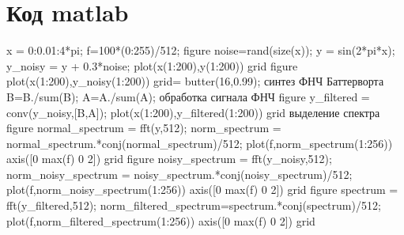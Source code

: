 \documentclass[10pt,a4paper]{report}
\begin{document}
\section{Код matlab}
x = 0:0.01:4*pi;\newline
f=100*(0:255)/512;\newline
figure\newline
noise=rand(size(x));\newline
y = sin(2*pi*x);\newline
y_noisy = y + 0.3*noise;\newline
plot(x(1:200),y(1:200))\newline
grid\newline
figure\newline
plot(x(1:200),y_noisy(1:200))\newline
grid\newline
[B,A] = butter(16,0.99); синтез ФНЧ Баттерворта\newline 
B=B./sum(B);\newline
A=A./sum(A);\newline
обработка сигнала ФНЧ\newline
figure\newline
y_filtered = conv(y_noisy,[B,A]);\newline
plot(x(1:200),y_filtered(1:200))\newline
grid\newline
выделение спектра\newline
figure\newline
normal_spectrum = fft(y,512);\newline
norm_spectrum = normal_spectrum.*conj(normal_spectrum)/512;\newline
plot(f,norm_spectrum(1:256))\newline
axis([0 max(f) 0 2])\newline
grid\newline
figure\newline
noisy_spectrum = fft(y_noisy,512);\newline
norm_noisy_spectrum = noisy_spectrum.*conj(noisy_spectrum)/512;\newline
plot(f,norm_noisy_spectrum(1:256))\newline
axis([0 max(f) 0 2])\newline
grid\newline
figure\newline
spectrum = fft(y_filtered,512);\newline
norm_filtered_spectrum=spectrum.*conj(spectrum)/512;\newline
plot(f,norm_filtered_spectrum(1:256))\newline
axis([0 max(f) 0 2])\newline
grid\newline
\end{document}
